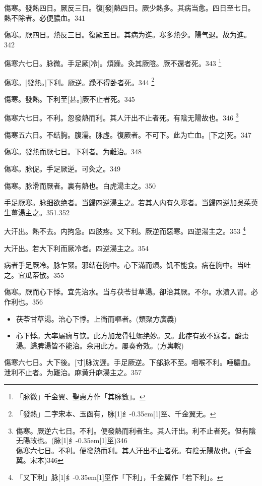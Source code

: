 \documentclass[oneside,b4paper]{ctexbook}
\begin{document}
\begin{flushleft}
傷寒。發熱四日。厥反三日。復[發]熱四日。厥少熱多。其病当愈。四日至七日。熱不除者。必便膿血。341

傷寒。厥四日。熱反三日。復厥五日。其病为進。寒多熱少。陽气退。故为進。342

傷寒六七日。脉微。手足厥[冷]。煩躁。灸其厥陰。厥不還者死。343
\footnote{「脉微」千金翼、聖惠方作「其脉數」。}

傷寒。[發熱。]下利。厥逆。躁不得卧者死。344
\footnote{「發熱」二字宋本、玉函有，脉{\hbox{\scalebox{0.68}[1]{纟}\kern-0.35em\scalebox{0.64}[1]{巠}}}、千金翼无。}

傷寒。發熱。下利至[甚。]厥不止者死。345

傷寒六七日。不利。忽發熱而利。其人汗出不止者死。有陰无陽故也。346
\footnote{傷寒。厥逆六七日。不利。便發熱而利者生。其人汗出。利不止者死。但有陰无陽故也。(脉{\hbox{\scalebox{0.68}[1]{纟}\kern-0.35em\scalebox{0.64}[1]{巠}}})346\\傷寒六七日。不利。便發熱而利。其人汗出不止者死。有陰无陽故也。(千金翼。宋本)346}

傷寒五六日。不结胸。腹濡。脉虛。復厥者。不可下。此为亡血。[下之]死。347

傷寒。發熱而厥七日。下利者。为難治。348

傷寒。脉促。手足厥逆。可灸之。349

傷寒。脉滑而厥者。裏有熱也。白虎湯主之。350

手足厥寒。脉细欲绝者。当歸四逆湯主之。若其人内有久寒者。当歸四逆加吳茱萸生薑湯主之。351.352

大汗出。熱不去。内拘急。四肢疼。又下利。厥逆而惡寒。四逆湯主之。353
\footnote{「又下利」脉{\hbox{\scalebox{0.68}[1]{纟}\kern-0.35em\scalebox{0.64}[1]{巠}}}作「下利」，千金翼作「若下利」。}

大汗出。若大下利而厥冷者。四逆湯主之。354

病者手足厥冷。脉乍緊。邪结在胸中。心下滿而煩。饥不能食。病在胸中。当吐之。宜瓜蒂散。355

傷寒。厥而心下悸。宜先治水。当与茯苓甘草湯。卻治其厥。不尔。水漬入胃。必作利也。356

\begin{itemize}
\item 茯苓甘草湯。治心下悸。上衝而嘔者。(類聚方廣義)
\item 心下悸。大率屬癇与饮。此方加龙骨牡蛎绝妙。又。此症有致不寐者。酸棗湯。歸脾湯皆不能治。余用此方。屢奏奇效。(方輿輗)
\end{itemize}

傷寒六七日。大下後。[寸]脉沈遲。手足厥逆。下部脉不至。咽喉不利。唾膿血。泄利不止者。为難治。麻黄升麻湯主之。357


\end{flushleft}
\end{document}
